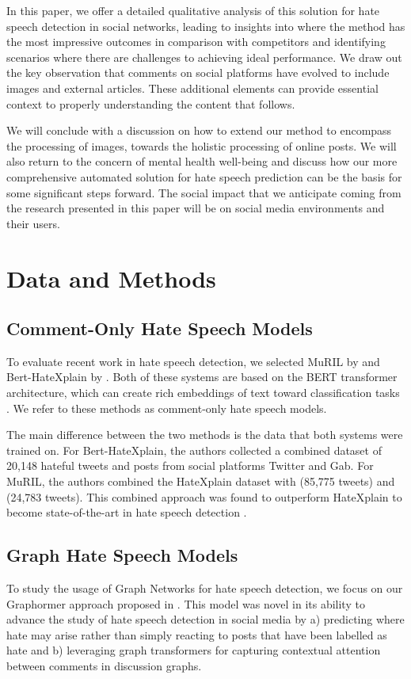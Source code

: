 \documentclass[letterpaper]{article} %
\newcommand{\edit}[1]{{#1}}
\begin{document}
In this paper, we offer a detailed qualitative analysis of this solution for hate speech detection in social networks, leading to insights into where the method has the most impressive outcomes in comparison with competitors and identifying scenarios where there are challenges to achieving ideal performance. We draw out the key observation that comments on social platforms have evolved to include images and external articles. These additional elements can provide essential context to properly understanding the content that follows.

We will conclude with a discussion on how to extend \edit{our method} to encompass the processing of images, towards the holistic processing of online posts. We will also return to the concern of mental health well-being and discuss how our more comprehensive automated solution for hate speech prediction can be the basis for some significant steps forward. The social impact that we anticipate coming from the research presented in this paper will be on social media environments and their users.

\section{Data and Methods}

\subsection{Comment-Only Hate Speech Models}
To evaluate recent work in hate speech detection, we selected MuRIL by \citet{das2022data} and Bert-HateXplain by \citet{mathew2021hatexplain}. Both of these systems are based on the BERT transformer architecture, which can create rich embeddings of text toward classification tasks \cite{devlin2019bert}. We refer to these methods as comment-only hate speech models.

The main difference between the two methods is the data that both systems were trained on. For Bert-HateXplain, the authors collected a combined dataset of 20,148 hateful tweets and posts from social platforms Twitter and Gab. For MuRIL, the authors combined the HateXplain dataset with \citet{founta2018large} (85,775 tweets) and \citet{davidson2017automated} (24,783 tweets). This combined approach was found to outperform HateXplain to become state-of-the-art in hate speech detection \cite{das2022data}.

\subsection{Graph Hate Speech Models}
To study the usage of Graph Networks for hate speech detection, we focus on our Graphormer approach proposed in \citet{hebert2022predicting}. This model was novel in its ability to advance the study of hate speech detection in social media by a) predicting where hate may arise rather than simply reacting to posts that have been labelled as hate and b) leveraging graph transformers for capturing contextual attention between comments in discussion graphs.
\end{document}
